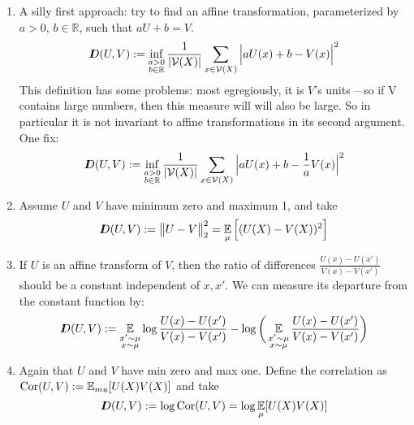 \documentclass{article}
\begin{document}
    \begin{enumerate}
    \item A silly first approach: try to find an affine transformation, parameterized by $a > 0$, $b \in \mathbb R$, such that $a U + b = V$. 
     \begin{equation*}
        I\mkern-8muD(U, V) := \inf_{\substack{a > 0\\b \in \mathbb R}}  \frac{1}{|\mathcal V(X)|}\sum_{x \in \mathcal V(X)} \Big| a U(x) + b - V(x) \Big|^2
        \end{equation*}
        This definition has some problems: most egregiously, it is $V$'s units -- so if V contains large numbers, then this measure will will also be large. So in particular it is not invariant to affine transformations in its second argument. One fix:
        \[
        I\mkern-8muD(U, V) := \inf_{\substack{a > 0\\b \in \mathbb R}}  \frac{1}{|\mathcal V(X)|}\sum_{x \in \mathcal V(X)} \Big| a U(x) + b - \frac1a V(x) \Big|^2
        \]
    \item Assume $U$ and $V$ have minimum zero and maximum 1, and take 
    \[ I\mkern-8muD(U,V) := \big\Vert U - V \big\Vert^2_2 = \operatorname*{\mathbb{E}}_\mu \Big[(U(X) - V(X))^2\Big]  \]
    \item If $U$ is an affine transform of $V$, then the ratio of differences $\frac{U(x) - U(x')}{V(x)- V(x')}$ should be a constant independent of $x,x'$. We can measure its departure from the constant function by:
    \[
        I\mkern-8muD(U,V) := \operatorname*{\mathbb{E}}_{\substack{x' \sim \mu \\ x \sim \mu}} \log \frac{U(x) - U(x')}{V(x)- V(x')} - 
         \log \bigg(\operatorname*{\mathbb{E}}_{\substack{x' \sim \mu \\ x \sim \mu}}\frac{U(x) - U(x')}{V(x)- V(x')} \bigg)
    \]
    \item Again that $U$ and $V$ have min zero and max one. Define the correlation as $\mathrm{Cor}(U,V) := \operatorname*{\mathbb{E}}_{mu}[U(X)V(X)]$ and take 
    \[
        I\mkern-8muD(U,V) := \log \mathrm{Cor}(U,V) = \log \operatorname*{\mathbb{E}}_\mu [U(X) V(X)]
    \]

\end{enumerate}
\end{document}
